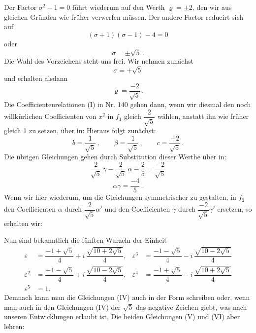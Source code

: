 Der Factor $\sigma^2-1=0$ führt wiederum auf den Werth $\varrho=\pm 2$, den wir aus gleichen Gründen wie früher verwerfen müssen. Der andere Factor reducirt sich auf
\[
(\sigma+1)(\sigma-1)-4=0
\]
oder
\[
\sigma=\pm\sqrt5\,.
\]
Die Wahl des Vorzeichens steht uns frei. Wir nehmen zunächst
\[
\sigma=+\sqrt5
\]
und erhalten alsdann
\[
\varrho=\frac{-2}{\sqrt5}\,.
\]
Die Coefficientenrelationen (I) in Nr. 140 gehen dann, wenn wir diesmal den noch willkürlichen Coefficienten von $x^2$ in $f_1$ gleich $\dfrac{2}{\sqrt5}$ wählen, anstatt ihn wie früher gleich 1 zu setzen, über in:
Hieraus folgt zunächst:
\[
b=\frac{1}{\sqrt5}\,,\qquad \beta=\frac{1}{\sqrt5}\,,\qquad c=\frac{-2}{\sqrt5}\,.
\]
Die übrigen Gleichungen gehen durch Substitution dieser Werthe über in:
\[
\frac{2}{\sqrt5}\,\gamma-\frac{2}{\sqrt5}\,\alpha-\frac{2}{5}=\frac{-2}{\sqrt5}
\]
\[
\alpha\gamma=\frac{-4}{5}\,.
\]
Wenn wir hier wiederum, um die Gleichungen symmetrischer zu gestalten, in $f_2$ den Coefficienten $\alpha$ durch $\dfrac{2}{\sqrt5}\alpha'$ und den Coefficienten $\gamma$ durch $\dfrac{-2}{\sqrt5}\gamma'$ ersetzen, so erhalten wir:


Nun sind bekanntlich die fünften Wurzeln der Einheit
\[
\begin{aligned}
\varepsilon &= \dfrac{-1+\sqrt5}{4} + i\,\dfrac{\sqrt{10+2\sqrt5}}{4}, &
\varepsilon^3 &= \dfrac{-1-\sqrt5}{4} - i\,\dfrac{\sqrt{10-2\sqrt5}}{4} \\
\varepsilon^2 &= \dfrac{-1-\sqrt5}{4} + i\,\dfrac{\sqrt{10-2\sqrt5}}{4}, &
\varepsilon^4 &= \dfrac{-1+\sqrt5}{4} - i\,\dfrac{\sqrt{10+2\sqrt5}}{4} \\
\varepsilon^5 &= 1. &&
\end{aligned}
\]
Demnach kann man die Gleichungen (IV) auch in der Form schreiben
oder, wenn man auch in den Gleichungen (IV) der $\sqrt5$ das negative Zeichen giebt, was nach unseren Entwicklungen erlaubt ist,
Die beiden Gleichungen (V) und (VI) aber lehren:

